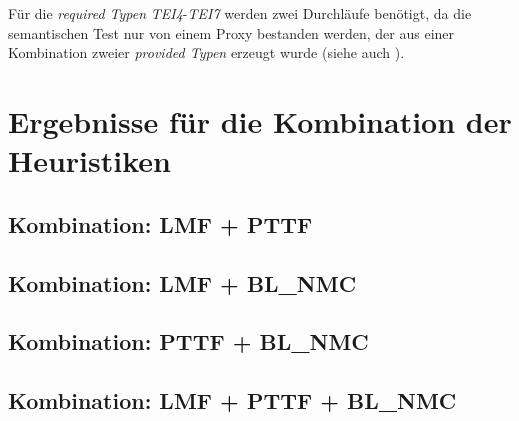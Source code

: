 \begin{multicols}{2}
\columnbreak
{}
\end{multicols}
\begin{multicols}{2}
\columnbreak
{}
\end{multicols}
\begin{multicols}{2}
\columnbreak
{}
\end{multicols}
\noindent
Für die \emph{required Typen} \emph{TEI4}-\emph{TEI7} werden zwei Durchläufe benötigt, da die semantischen Test nur von einem Proxy bestanden werden, der aus einer Kombination zweier \emph{provided Typen} erzeugt wurde (siehe auch ).





\section{Ergebnisse für die Kombination der Heuristiken}
\subsection{Kombination: LMF + PTTF}
\subsection{Kombination: LMF + BL\_NMC}
\subsection{Kombination: PTTF + BL\_NMC}
\subsection{Kombination: LMF + PTTF + BL\_NMC}